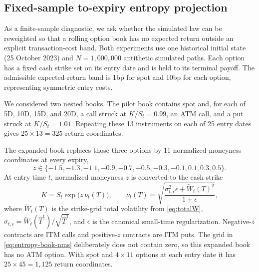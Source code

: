 \documentclass[11pt,a4paper]{article}
\begin{document}
\subsection{Fixed-sample to-expiry entropy projection}
\label{sec:fixed-sample-entropy}

As a finite-sample diagnostic, we ask whether the simulated law can be
reweighted so that a rolling option book has no expected return outside an
explicit transaction-cost band.  Both experiments use one historical initial
state (25 October 2023) and $N=1{,}000{,}000$ antithetic simulated paths.  Each
option has a fixed cash strike set on its entry date and is held to its
terminal payoff.  The admissible expected-return band is 1bp for spot and
10bp for each option, representing symmetric entry costs.

We considered two nested books.  The pilot book contains spot and, for each
of 5D, 10D, 15D, and 20D, a call struck at $K/S_t=0.99$, an ATM call, and a
put struck at $K/S_t=1.01$.  Repeating these 13 instruments on each of 25
entry dates gives $25\times13=325$ return coordinates.

The expanded book replaces those three options by 11 normalized-moneyness
coordinates at every expiry,
\begin{equation}
  z\in\{-1.5,-1.3,-1.1,-0.9,-0.7,-0.5,-0.3,-0.1,
          0.1,0.3,0.5\}.
  \label{eq:entropy-book-nms}
\end{equation}
At entry time $t$, normalized moneyness $z$ is converted to the cash strike
\begin{equation}
  K=S_t\exp\!\bigl(z\,\nu_t(T)\bigr),\qquad
  \nu_t(T)=\sqrt{\frac{\sigma_{t,\epsilon}^2\epsilon+
                           \widetilde W_t(T)^2}
                           {1+\epsilon}},
  \label{eq:entropy-book-strike}
\end{equation}
where $\widetilde W_t(T)$ is the strike-grid total volatility from
\eqref{eq:totalW},
$\sigma_{t,\epsilon}=\widetilde W_t(\hat T^1)/\sqrt{\hat T^1}$, and
$\epsilon$ is the canonical small-time regularization.  Negative-$z$
contracts are ITM calls and positive-$z$ contracts are ITM puts.  The grid in
\eqref{eq:entropy-book-nms} deliberately does not contain zero, so this
expanded book has no ATM option.  With spot and $4\times11$ options at each
entry date it has $25\times45=1{,}125$ return coordinates.
\end{document}
